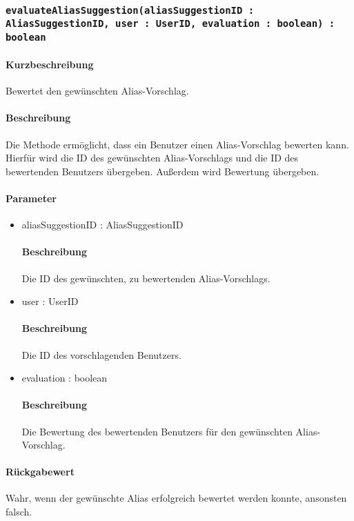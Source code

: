 \subsubsection{\texttt{evaluateAliasSuggestion(aliasSuggestionID : AliasSuggestionID, user : UserID, evaluation : boolean) : boolean}}%
\paragraph*{Kurzbeschreibung}
Bewertet den gewünschten Alias-Vorschlag.
\paragraph*{Beschreibung}
Die Methode ermöglicht, dass ein Benutzer einen Alias-Vorschlag bewerten kann. 
Hierfür wird die ID des gewünschten Alias-Vorschlags und die ID des bewertenden Benutzers übergeben.
Außerdem wird Bewertung übergeben.
\paragraph*{Parameter}
\begin{itemize}
	\item aliasSuggestionID : AliasSuggestionID
		\paragraph*{Beschreibung}
		Die ID des gewünschten, zu bewertenden Alias-Vorschlags.
	\item user : UserID
		\paragraph*{Beschreibung}
		Die ID des vorschlagenden Benutzers.
	\item evaluation : boolean
		\paragraph*{Beschreibung}
		Die Bewertung des bewertenden Benutzers für den gewünschten Alias-Vorschlag.
\end{itemize}
\paragraph*{Rückgabewert}
Wahr, wenn der gewünschte Alias erfolgreich bewertet werden konnte, ansonsten falsch.
